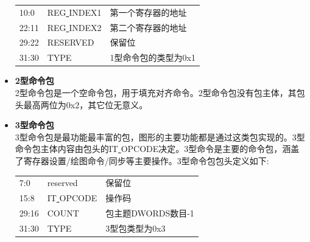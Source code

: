 \begin{itemize}
\begin{center}
\begin{supertabular}{p{2.cm}p{3.cm}m{10.cm}}
	10:0 & REG\underline{ }INDEX1 & 第一个寄存器的地址 \\
	22:11 & REG\underline{ }INDEX2 & 第二个寄存器的地址 \\
	29:22 & RESERVED & 保留位 \\
	31:30 & TYPE & 1型命令包的类型为0x1 \\
\end{supertabular}
\end{center}
\vspace{6pt}

\item{\textbf{2型命令包}} \\
2型命令包是一个空命令包，用于填充对齐命令。2型命令包没有包主体，其包头最高两位为0x2，其它位无意义。

\item{\textbf{3型命令包}} \\
3型命令包是最功能最丰富的包，图形的主要功能都是通过这类包实现的。3型命令包主体内容由包头的IT\underline{ }OPCODE决定。3型命令是主要的命令包，涵盖了寄存器设置/绘图命令/同步等主要操作。3型命令包包头定义如下:
\vspace{6pt}
\begin{center}  
\tablelasttail{\bottomrule}

\begin{supertabular}{p{2.cm}p{3.cm}m{10.cm}}
	7:0 & reserved & 保留位 \\
	15:8 & IT\underline{ }OPCODE & 操作码 \\
	29:16 & COUNT & 包主题DWORDS数目-1 \\
	31:30 & TYPE & 3型包类型为0x3 \\
\end{supertabular}
\end{center}
\vspace{6pt}
\end{itemize}

